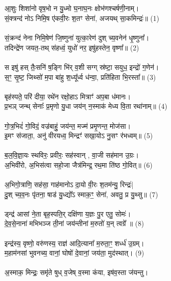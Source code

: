 \subsection{}
आ॒शुः शिशा॑नो वृष॒भो न यु॒ध्मो घ॒नाघ॒नः क्षोभ॑णश्चर्षणी॒नाम्।\\
सं॒क्त्रन्द॑ नोऽ निमि॒ष ए॑कवी॒रः श॒तꣳ सेना॑, अजयथ् सा॒कमिन्द्रः॑॥ (1)\\
\\
सं॒क्रन्द॑ नेना निमि॒षेण॑ जि॒ष्णुना॑ युत्का॒रेण॑ दुश् च्य॒वनेन॑ धृ॒ष्णुना᳚।\\
तदिन्द्रे॑ण जयत॒-तथ् स॑हध्वं॒ युधो॑ नर॒ इषु॑हस्तेन॒ वृष्णा᳚॥ (2)\\
\\
स इषु॑ हस् तैः॒सनि॑ ष॒ङ्गि भि॑र् व॒शी सग्ग् स्र॑ष्टा॒ सयुध॒ इन्द्रो॑ ग॒णेन॑।\\
स॒ꣳ॒ सृ॒ष्ट॒ जिथ्सो॑ म॒पा बा॑हु श॒ध्यू᳚र्ध्व ध॑न्वा॒, प्रति॑हिता भि॒रस्ता᳚॥ (3)\\
\\
बृह॑स्पते॒ परि॑ दीया॒ रथे॑न रक्षो॒हाऽ मित्राꣳ॑ अप॒बा ध॑मानः।\\
प्र॒भञ् जन्थ् सेनाः᳚ प्र॒मृणो यु॒धा जय॑न् न॒स्माक॑ मेध्य वि॒ता रथा॑नाम्॥ (4)\\
\\
गो॒त्र॒भिदं॑ गो॒विदं॒ वज्र॑बाहुं॒ जय॑न्त॒ मज्म॑ प्रमृ॒णन्त॒ मोज॑सा।\\
इ॒मꣳ स॑जाता॒, अनु॑ वीरयध्व॒ मिन्द्रꣳ॑ सखा॒योऽ नु॒सꣳ र॑भध्वम्॥ (5)\\
\\
ब॒ल॒वि॒ज्ञा॒यः स्थविरः॒ प्रवीरः॒ सह॑स्वान् , वा॒जी सह॑मान उ॒ग्रः।\\
अ॒भिवी॑रो, अ॒भिस॑त्वा सहो॒जा जैत्र॑मिन्द्र॒ रथ॒मा ति॑ष्ठ गो॒वित्॥ (6)\\
\\
अ॒भिगो॒त्राणि॒ सह॑सा॒ गाह॑मानोऽ दा॒यो वी॒रः श॒तम॑न्यु॒ रिन्द्रः॑|\\
दु॒श् च्य॒व॒नः पृ॑तना॒ षाड॑ यु॒ध्द्यो᳚ऽ स्माक॒ꣳ॒ सेना॑, अवतु॒ प्र यु॒थ्सु॥ (7)\\
\\
ड्न्द्र॑ आसां ने॒ता बृह॒स्पति॒र् दक्षि॑णा य॒ज्ञः पु॒र एतु॒ सोमः॑।\\
दे॒व॒से॒नाना॑ मभिभञ्ज ती॒नां जय॑न्तीनां म॒रुतो॑ य॒न् त्वग्रे᳚ ॥ (8)\\
\\
इन्द्र॑स्य॒ वृष्णो॒ वरु॑णस्य॒ राज्ञ॑ आदि॒त्याना᳚ म॒रुता॒ꣳ॒ शर्ध्ध॑ उ॒ग्रम्।\\
म॒हाम॑नसां भुवनच्य॒ वानां॒ घोषो॑ दे॒वानां॒ जय॑ता॒ मुद॑स्थात्। (9)\\
\\
अ॒स्माक॒ मिन्द्रः॒ समृ॑ते षुध् व॒जेष् व॒स्मा कंया, इष॑व॒स्ता ज॑यन्तु।\\

